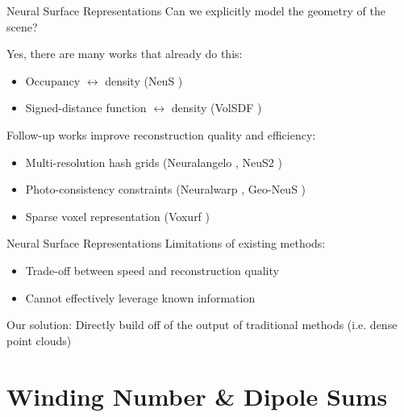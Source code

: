 \documentclass[10pt]{beamer}
\begin{document}
\begin{frame}{Neural Surface Representations}
    Can we explicitly model the \alert{geometry} of the scene?

    Yes, there are many works that already do this:
    \begin{itemize}
        \item Occupancy \(\leftrightarrow\) density {\tiny (NeuS \citep{wang2021neus})}
        \item Signed-distance function \(\leftrightarrow\) density {\tiny (VolSDF \citep{yariv2021volume})}
    \end{itemize}

    Follow-up works improve reconstruction quality and efficiency:
    \begin{itemize}
        \item Multi-resolution hash grids {\tiny (Neuralangelo \citep{li2023neuralangelo}, NeuS2 \citep{neus2})}
        \item Photo-consistency constraints {\tiny (Neuralwarp \citep{neuralwarp}, Geo-NeuS \citep{Fu2022GeoNeus})}
        \item Sparse voxel representation {\tiny (Voxurf \citep{wu2022voxurf})}
    \end{itemize}
\end{frame}

\begin{frame}{Neural Surface Representations}
    Limitations of existing methods:
    \begin{itemize}
        \item Trade-off between speed and reconstruction quality
        \item Cannot effectively leverage \alert{known information}
    \end{itemize}

    Our solution: Directly build off of the output of traditional methods (i.e. dense \alert{point clouds})
\end{frame}

\section{Winding Number \& Dipole Sums}
\end{document}
